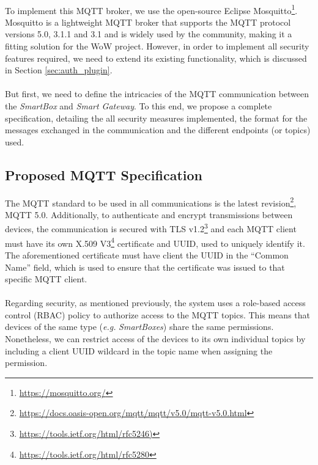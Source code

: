 \paragraph{} To implement this \acs{MQTT} broker, we use the open-source Eclipse Mosquitto\footnote{\url{https://mosquitto.org/}}. Mosquitto is a lightweight \acs{MQTT} broker that supports the \acs{MQTT} protocol versions 5.0, 3.1.1 and 3.1 and is widely used by the community, making it a fitting solution for the \acs{WoW} project. However, in order to implement all security features required, we need to extend its existing functionality, which is discussed in Section \ref{sec:auth_plugin}.

\paragraph{} But first, we need to define the intricacies of the \acs{MQTT} communication between the \textit{SmartBox} and \textit{Smart Gateway}. To this end, we propose a complete specification, detailing the all security measures implemented, the format for the messages exchanged in the communication and the different endpoints (or topics) used. 

\subsection{Proposed \acs{MQTT} Specification}

The \acs{MQTT} standard to be used in all communications is the latest revision\footnote{\url{https://docs.oasis-open.org/mqtt/mqtt/v5.0/mqtt-v5.0.html}}, MQTT 5.0. Additionally, to authenticate and encrypt transmissions between devices, the communication is secured with \acs{TLS} v1.2\footnote{\url{https://tools.ietf.org/html/rfc5246)}} and each \acs{MQTT} client must have its own X.509 V3\footnote{\url{https://tools.ietf.org/html/rfc5280}} certificate and \acs{UUID}, used to uniquely identify it. The aforementioned certificate must have client the \acs{UUID} in the ``Common Name'' field, which is used to ensure that the certificate was issued to that specific \acs{MQTT} client.

\paragraph{} Regarding security, as mentioned previously, the system uses a role-based access control (\acs{RBAC}) policy to authorize access to the \acs{MQTT} topics. This means that devices of the same type (\textit{e.g.} \textit{SmartBoxes}) share the same permissions. 
Nonetheless, we can restrict access of the devices to its own individual topics by including a client \acs{UUID} wildcard in the topic name when assigning the permission.

